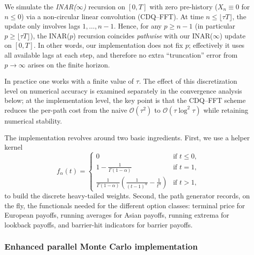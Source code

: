 \documentclass[letterpaper]{article}
\numberwithin{equation}{section}
\theoremstyle{definition}
\theoremstyle{remark}
\begin{document}
We simulate the \emph{INAR($\infty$)} recursion on $[0,T]$ with zero pre-history ($X_n\equiv0$ for $n\le0$) via a non-circular linear convolution (CDQ--FFT). At time $n\le\lfloor\tau T\rfloor$, the update only involves lags $1,\dots,n-1$. Hence, for any $p\ge n-1$ (in particular $p\ge\lfloor\tau T\rfloor$), the INAR($p$) recursion coincides \emph{pathwise} with our INAR($\infty$) update on $[0,T]$. In other words, our implementation does not fix $p$; effectively it uses all available lags at each step, and therefore no extra ``truncation'' error from $p\to\infty$ arises on the finite horizon.

In practice one works with a finite value of $\tau$. The effect of this discretization level on numerical accuracy is examined separately in the convergence analysis below; at the implementation level, the key point is that the CDQ--FFT scheme reduces the per-path cost from the naive $\mathcal{O}(\tau^2)$ to $\mathcal{O}(\tau\log^2\tau)$ while retaining numerical stability.

The implementation revolves around two basic ingredients. First, we use a
helper kernel
\[
f_{\alpha}(t) =
\begin{cases}
0 & \text{if } t \leq 0, \\
1 - \frac{1}{\Gamma(1-\alpha)} & \text{if } t = 1, \\
\frac{1}{\Gamma(1-\alpha)} \left(\frac{1}{(t-1)^{\alpha}} - \frac{1}{t^{\alpha}}\right) & \text{if } t > 1,
\end{cases}
\]
to build the discrete heavy-tailed weights. Second, the path generator records,
on the fly, the functionals needed for the different option classes: terminal
price for European payoffs, running averages for Asian payoffs, running extrema
for lookback payoffs, and barrier-hit indicators for barrier payoffs.

\subsubsection{Enhanced parallel Monte Carlo implementation}
\end{document}

